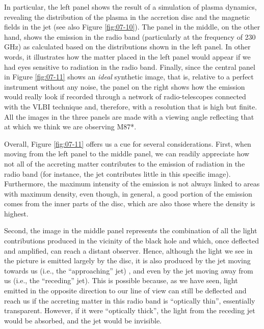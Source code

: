 In particular, the left panel shows the result of a simulation of plasma dynamics,
revealing the distribution of the plasma in the accretion disc and the magnetic fields
in the jet (see also Figure \ref{fig:07-10}). The panel in the middle, on the other hand, shows the
emission in the radio band (particularly at the frequency of 230 GHz) as calculated
based on the distributions shown in the left panel. In other words, it illustrates how
the matter placed in the left panel would appear if we had eyes sensitive to radiation
in the radio band. Finally, since the central panel in Figure \ref{fig:07-11} shows an \emph{ideal}
synthetic image, that is, relative to a perfect instrument without
any noise, the panel on the right shows how the emission would really
look if recorded through a network of radio-telescopes connected with the VLBI technique
and, therefore, with a resolution that is high but finite. All the images in the three
panels are made with a viewing angle reflecting that at which we think we are observing
M87*.

Overall, Figure \ref{fig:07-11} offers us a cue for several considerations. First, when moving from
the left panel to the middle panel, we can readily appreciate how not all of the
accreting matter contributes to the emission of radiation in the radio band (for
instance, the jet contributes little in this specific image). Furthermore, the maximum
intensity of the emission is not always linked to areas with maximum density, even
though, in general, a good portion of the emission comes from the inner parts of the
disc, which are also those where the density is highest.

Second, the image in the middle panel represents the combination of all the light
contributions produced in the vicinity of the black hole and which, once deflected and
amplified, can reach a distant observer. Hence, although the light we see in the picture
is emitted largely by the disc, it is also produced by the jet moving towards us (i.e.,
the ``approaching'' jet) , and even by the jet moving away from us
(i.e., the ``receding'' jet). This is possible because, as we have
seen, light emitted in the opposite direction to our line of view can still be deflected
and reach us if the accreting matter in this radio band is ``optically thin'',
essentially transparent. However, if it were ``optically thick'', the light from the
receding jet would be absorbed, and the jet would be invisible.

